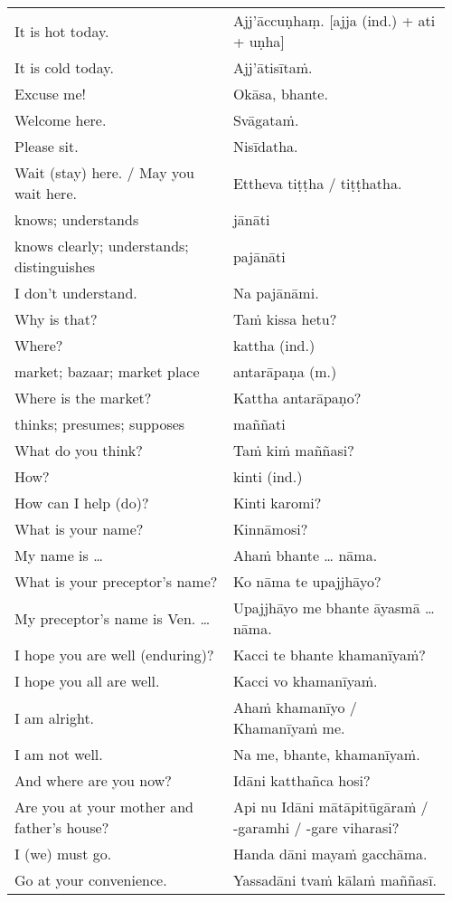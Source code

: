\documentclass[a5paper]{memoir}
\begin{document}
\begin{longtable}{L{0.48\linewidth} L{0.48\linewidth}}
It is hot today. & Ajj'āccuṇhaṃ. [ajja (ind.) + ati  + uṇha]\\[0pt]
It is cold today. & Ajj'ātisītaṁ.\\[0pt]
Excuse me! & Okāsa, bhante.\\[0pt]
Welcome here. & Svāgataṁ.\\[0pt]
Please sit. & Nisīdatha.\\[0pt]
Wait (stay) here. / May you wait here. & Ettheva tiṭṭha / tiṭṭhatha.\\[0pt]
knows; understands & jānāti\\[0pt]
knows clearly; understands; distinguishes & pajānāti\\[0pt]
I don't understand. & Na pajānāmi.\\[0pt]
Why is that? & Taṁ kissa hetu?\\[0pt]
Where? & kattha (ind.)\\[0pt]
market; bazaar; market place & antarāpaṇa (m.)\\[0pt]
Where is the market? & Kattha antarāpaṇo?\\[0pt]
thinks; presumes; supposes & maññati\\[0pt]
What do you think? & Taṁ kiṁ maññasi?\\[0pt]
How? & kinti (ind.)\\[0pt]
How can I help (do)? & Kinti karomi?\\[0pt]
What is your name? & Kinnāmosi?\\[0pt]
My name is \ldots{} & Ahaṁ bhante \ldots{} nāma.\\[0pt]
What is your preceptor's name? & Ko nāma te upajjhāyo?\\[0pt]
My preceptor's name is Ven. \ldots{} & Upajjhāyo me bhante āyasmā \ldots{} nāma.\\[0pt]
I hope you are well (enduring)? & Kacci te bhante khamanīyaṁ?\\[0pt]
I hope you all are well. & Kacci vo khamanīyaṁ.\\[0pt]
I am alright. & Ahaṁ khamanīyo / Khamanīyaṁ me.\\[0pt]
I am not well. & Na me, bhante, khamanīyaṁ.\\[0pt]
And where are you now? & Idāni katthañca hosi?\\[0pt]
Are you at your mother and father's house? & Api nu Idāni mātāpitūgāraṁ / -garamhi / -gare viharasi?\\[0pt]
I (we) must go. & Handa dāni mayaṁ gacchāma.\\[0pt]
Go at your convenience. & Yassadāni tvaṁ kālaṁ maññasī.\\[0pt]

\end{longtable}
\end{document}

